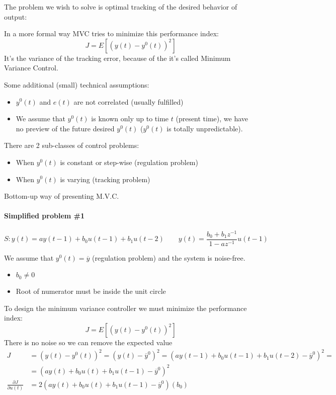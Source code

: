 The problem we wish to solve is optimal tracking of the desired behavior of output:

In a more formal way MVC tries to minimize this performance index:
\[
    J = E\left[ (y(t) - y^0(t))^2 \right]
\]
It's the variance of the tracking error, because of the it's called Minimum Variance Control.

Some additional (small) technical assumptions:
\begin{itemize}
    \item $y^0(t)$ and $e(t)$ are not correlated (usually fulfilled)
    \item We assume that $y^0(t)$ is known only up to time $t$ (present time), we have no preview of the future desired $y^0(t)$ ($y^0(t)$ is totally unpredictable).
\end{itemize}

\begin{remark}
    There are 2 sub-classes of control problems:
    \begin{itemize}
        \item When $y^0(t)$ is constant or step-wise (regulation problem)
        \item When $y^0(t)$ is varying (tracking problem)
    \end{itemize}

\end{remark}

Bottom-up way of presenting M.V.C.

\paragraph{Simplified problem \#1}
\[
    S: y(t) = ay(t-1) + b_0u(t-1) + b_1u(t-2) \qquad y(t) = \frac{b_0+b_1z^{-1}}{1-az^{-1}}u(t-1)
\]

We assume that $y^0(t)=\overline{y}$ (regulation problem) and the system is noise-free.
\begin{itemize}
    \item $b_0\ne 0$
    \item Root of numerator must be inside the unit circle
\end{itemize}

To design the minimum variance controller we must minimize the performance index:
\[
    J = E\left[ (y(t) - y^0(t))^2 \right]
\]
There is no noise so we can remove the expected value
\begin{align*}
    J &= \left( y(t) - y^0(t) \right)^2 = \left( y(t) - \overline{y}^0 \right)^2 = \left( ay(t-1)+b_0u(t-1)+b_1u(t-2) - \overline{y}^0 \right)^2 = \\
    &= \left( ay(t) + b_0u(t) + b_1u(t-1)-\overline{y}^0 \right)^2 \\
    \frac{\partial J}{\partial u(t)} &= 2\left( ay(t)+b_0u(t)+b_1u(t-1)-\overline{y}^0 \right)\left(b_0\right)
\end{align*}

